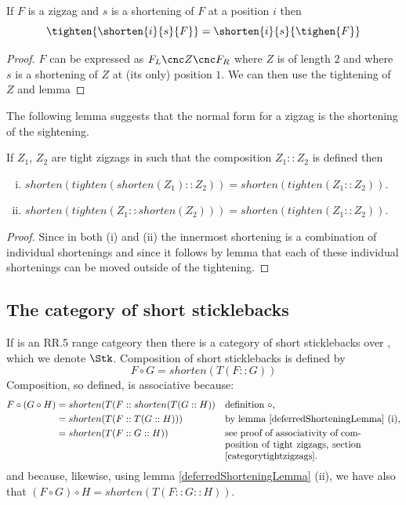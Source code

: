 \begin{lemma}
If $F$ is a zigzag and $s$ is a shortening of $F$ at a position $i$ then
\[
\tighten{\shorten{i}{s}{F}} = \shorten{i}{s}{\tighen{F}}
\]
\end{lemma}
\begin{proof}
$F$ can be expressed as $F_L \cnc Z \cnc F_R$ where 
$Z$ is of length $2$ and where $s$ is a shortening of $Z$ at (its only)
position $1$. We can then use the tightening of $Z$ and lemma 

\end{proof}
\begin{aside}
The following lemma suggests that the normal form for a zigzag is the
shortening of the sightening.
\end{aside}
\begin{lemma}
If $Z_1$, $Z_2$ are tight zigzags in
 such that the composition $Z_1 :: Z_2$ is defined then
\begin{enumerate}[(i)]
\item 
$shorten(tighten(shorten(Z_1) :: Z_2))= shorten(tighten(Z_1 :: Z_2)).$
\item
$shorten(tighten(Z_1 :: shorten(Z_2)))= shorten(tighten(Z_1 :: Z_2)).$
\end{enumerate}
\end{lemma}
\begin{proof}
Since in both (i) and (ii) the innermost shortening is a combination 
of individual shortenings and since
it follows by lemma  that 
each of these individual shortenings can be moved outside of the tightening.
\end{proof}

\subsection{The category of short sticklebacks}

If \catcw is an RR.5 range catgeory then
 there is a category of short sticklebacks over \catc, which we denote
 $\Stk$.
Composition of short sticklebacks is defined by
\[
F \circ G = shorten(T(F::G)) 
\]
Composition, so defined, is associative because:
\begin{align*}
F \circ (G \circ H)
  &= shorten(T(F :: shorten(T(G ::H)) && \mbox{definition $\circ$,} \\
  &= shorten (T(F::T(G::H))) && \mbox{by lemma \ref{deferredShorteningLemma} (i),} \\
  &= shorten (T(F::G::H))    && \mbox{\parbox[t]{5cm}{see proof of associativity of composition of tight zigzags, section \ref{categorytightzigzags}.}}
\end{align*}  
and because, likewise, 
using lemma \ref{deferredShorteningLemma} (ii),
we have also that $(F \circ G) \circ H=shorten (T(F::G::H))$.

